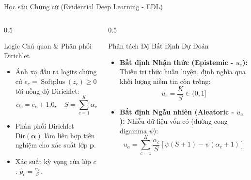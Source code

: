 \documentclass[aspectratio=169, 10pt]{beamer}
\newcommand{\Dir}{\text{Dir}}
\DeclareMathOperator{\softplus}{Softplus}
\begin{document}
\begin{frame}{Học sâu Chứng cứ (Evidential Deep Learning - EDL)}
  \begin{columns}
    \begin{column}{0.5\textwidth}
      \begin{block}{Logic Chủ quan \& Phân phối Dirichlet}
        \begin{itemize}
          \item Ánh xạ đầu ra logits chứng cứ $e_c = \softplus(z_c) \ge 0$ tới nồng độ Dirichlet:
          $$\alpha_c = e_c + 1.0, \quad S = \sum_{c=1}^K \alpha_c$$
          \item Phân phối Dirichlet $\Dir(\bm{\alpha})$ làm liên hợp tiên nghiệm cho xác suất lớp $\bm{p}$.
          \item Xác suất kỳ vọng của lớp $c$: $\hat{p}_c = \frac{\alpha_c}{S}$.
        \end{itemize}
      \end{block}
    \end{column}
    \begin{column}{0.5\textwidth}
      \begin{exampleblock}{Phân tách Độ Bất Định Dự Đoán}
        \begin{itemize}
          \item \textbf{Bất định Nhận thức (Epistemic - $u_e$):}
          Thiếu tri thức huấn luyện, định nghĩa qua khối lượng niềm tin còn trống:
          $$u_e = \frac{K}{S} \in (0, 1]$$
          \item \textbf{Bất định Ngẫu nhiên (Aleatoric - $u_a$):}
          Nhiễu dữ liệu vốn có (đường cong digamma $\psi$):
          $$u_a = \sum_{c=1}^K \frac{\alpha_c}{S} \left[ \psi(S + 1) - \psi(\alpha_c + 1) \right]$$
        \end{itemize}
      \end{exampleblock}
    \end{column}
  \end{columns}
\end{frame}
\end{document}
